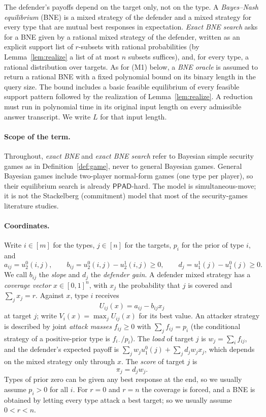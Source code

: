 The defender's payoffs depend on the target only, not on the type. A \emph{Bayes--Nash equilibrium}
(BNE) is a mixed strategy of the defender and a mixed strategy for every type that are mutual best
responses in expectation. \emph{Exact BNE search} asks for a BNE given by a rational mixed strategy of
the defender, written as an explicit support list of $r$-subsets with rational probabilities (by
Lemma~\ref{lem:realize} a list of at most $n$ subsets suffices), and, for every type, a rational
distribution over targets. As for (M1) below, a \emph{BNE oracle} is assumed to return a rational BNE
with a fixed polynomial bound on its binary length in the query size. The
bound includes a basic feasible equilibrium of every feasible support
pattern followed by the realization of Lemma~\ref{lem:realize}. A
reduction must run in polynomial time in its original input length on
every admissible answer transcript. We write $L$ for that input length.

\paragraph{Scope of the term.} Throughout, \emph{exact BNE} and \emph{exact BNE search} refer to Bayesian simple security games as in Definition~\ref{def:game}, never to general Bayesian games. General Bayesian games include two-player normal-form games (one type per player), so their equilibrium search is already $\mathsf{PPAD}$-hard. The model is simultaneous-move; it is not the Stackelberg (commitment) model that most of the security-games literature studies.

\paragraph{Coordinates.} Write $i\in[m]$ for the types, $j\in[n]$ for the targets, $p_i$ for the
prior of type $i$, and
\begin{equation}\label{eq:dictionary}
a_{ij}=u_2^0(i,j),\qquad b_{ij}=u_2^0(i,j)-u_2^1(i,j)\ge0,\qquad d_j=u_1^1(j)-u_1^0(j)\ge0 .
\end{equation}
We call $b_{ij}$ the \emph{slope} and $d_j$ the \emph{defender gain}. A defender mixed strategy has a
\emph{coverage vector} $x\in[0,1]^n$, with $x_j$ the probability that $j$ is covered and
$\sum_jx_j=r$. Against $x$, type $i$ receives
\[
U_{ij}(x)=a_{ij}-b_{ij}x_j
\]
at target $j$; write $V_i(x)=\max_jU_{ij}(x)$ for its best value. An attacker strategy is described by
joint \emph{attack masses} $f_{ij}\ge0$ with $\sum_jf_{ij}=p_i$ (the conditional strategy of a
positive-prior type is $f_{i\cdot}/p_i$). The \emph{load} of target $j$ is $w_j=\sum_if_{ij}$, and the
defender's expected payoff is $\sum_jw_ju_1^0(j)+\sum_jd_jw_jx_j$, which depends on the mixed strategy
only through $x$. The \emph{score} of target $j$ is
\[
\pi_j=d_jw_j .
\]
Types of prior zero can be given any best response at the end, so we usually assume $p_i>0$ for all
$i$. For $r=0$ and $r=n$ the coverage is forced, and a BNE is obtained by letting every type attack a
best target; so we usually assume $0<r<n$.

